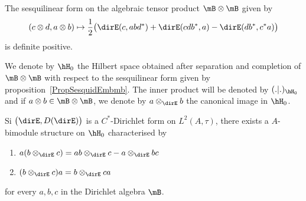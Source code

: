 \begin{proposition}		\label{PropSesquidEmbmb}
	The sesquilinear form on the algebraic tensor product $\mB\otimes\mB$ given by
	\begin{equation}
		(c\otimes d,a\otimes b)\mapsto\frac{ 1 }{2}\big( \dirE(c,abd^*)+\dirE(cdb^*,a)-\dirE(db^*,c^*a) \big)
	\end{equation}
	is definite positive.
\end{proposition}

We denote by $\hH_0$ the Hilbert space obtained after separation\cite{AlgOpGirard} and completion of $\mB\otimes\mB$ with respect to the sesquilinear form given by proposition~\ref{PropSesquidEmbmb}. The inner product will be denoted by $(.|.)_{\hH_0}$ and if $a\otimes b\in\mB\otimes\mB$, we denote by $a\otimes_{\dirE}b$ the canonical image in $\hH_0$.

\begin{theorem}
	Si $\big( \dirE,D(\dirE) \big)$ is a $C^*$-Dirichlet form on $L^2(A,\tau)$, there exists a $A$-bimodule structure on $\hH_0$ characterised by
	\begin{enumerate}
		\item
			$a(b\otimes_{\dirE}c)=ab\otimes_{\dirE}c-a\otimes_{\dirE}bc$
		\item
			$(b\otimes_{\dirE}c)a=b\otimes_{\dirE}ca$
	\end{enumerate}
	for every $a,b,c$ in the Dirichlet algebra $\mB$.
\end{theorem}
